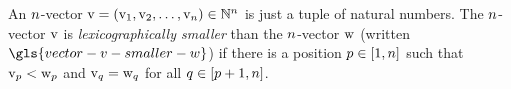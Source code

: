 
An $n$-vector $\mathrm{v} = (\mathrm{v}_{1}, \mathrm{v}_{2}, \dots, \mathrm{v}_{n}) \in
\mathbb{N}^{n}$ is just a tuple of natural numbers.
The $n$-vector $\mathrm{v}$ is \emph{lexicographically smaller} than the
$n$-vector $\mathrm{w}$ (written $\gls{vector-v-smaller-w}$) if there is a
position $p \in [1, n]$ such that $\mathrm{v}_{p} < \mathrm{w}_{p}$ and
$\mathrm{v}_{q} = \mathrm{w}_{q}$ for all $q \in [p+1, n]$.